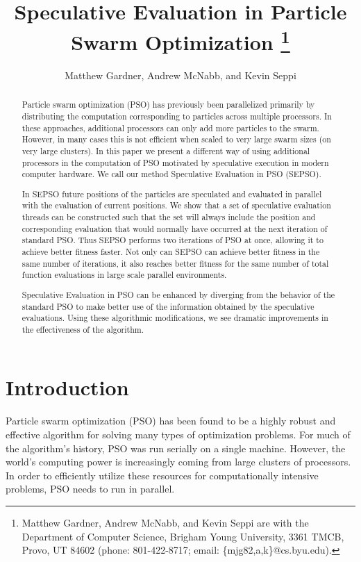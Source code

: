 \documentclass[journal,letterpaper]{IEEEtran}
\title{\ \\ \LARGE\bf Speculative Evaluation in Particle Swarm Optimization%
\thanks{Matthew Gardner, Andrew McNabb, and Kevin Seppi are with the Department
of Computer Science, Brigham Young University, 3361 TMCB, Provo, UT 84602
(phone: 801-422-8717; email: \{mjg82,a,k\}@cs.byu.edu).}%
}
\date{}
\author{Matthew Gardner, Andrew McNabb, and Kevin Seppi}
\begin{document}
\maketitle

\begin{abstract}

Particle swarm optimization (PSO) has previously been parallelized primarily by
distributing the computation corresponding to particles across multiple
processors.  In these approaches, additional processors can only add more
particles to the swarm.  However, in many cases this is not efficient when
scaled to very large swarm sizes (on very large clusters).  In this paper we
present a different way of using additional processors in the computation of
PSO motivated by speculative execution in modern computer hardware.  We call
our method Speculative Evaluation in PSO (SEPSO).

In SEPSO future positions of the particles are speculated and evaluated in
parallel with the evaluation of current positions.  We show that a set of
speculative evaluation threads can be constructed such that the set will always
include the position and corresponding evaluation that would normally have
occurred at the next iteration of standard PSO.  Thus SEPSO performs two
iterations of PSO at once, allowing it to achieve better fitness faster.  Not
only can SEPSO can achieve better fitness in the same number of iterations, it
also reaches better fitness for the same number of total function evaluations
in large scale parallel environments.

Speculative Evaluation in PSO can be enhanced by diverging from the behavior of
the standard PSO to make better use of the information obtained by the
speculative evaluations.  Using these algorithmic modifications, we see
dramatic improvements in the effectiveness of the algorithm. 

\end{abstract}

\section{Introduction}
\label{sec:intro}

Particle swarm optimization (PSO) has been found to be a highly robust and
effective algorithm for solving many types of optimization problems.  For much
of the algorithm's history, PSO was run serially on a single machine.  However,
the world's computing power is increasingly coming from large clusters of
processors.  In order to efficiently utilize these resources for
computationally intensive problems, PSO needs to run in parallel.
\end{document}
